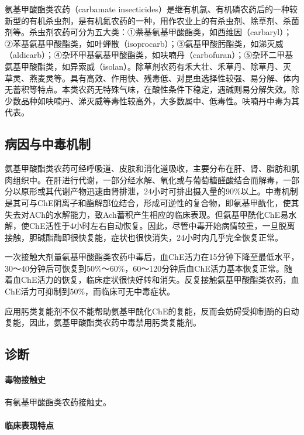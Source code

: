 氨基甲酸酯类农药（carbamate
insecticides）是继有机氯、有机磷农药后的一种较新型的有机杀虫剂，是有机氮农药的一种，用作农业上的有杀虫剂、除草剂、杀菌剂等。杀虫剂农药可分为五大类：①萘基氨基甲酸酯类，如西维因（carbaryl）；②苯基氨基甲酸酯类，如叶蝉散（isoprocarb）；③氨基甲酸肟酯类，如涕灭威（aldicarb）；④杂环甲基氨基甲酸酯类，如呋喃丹（carbofuran）；⑤杂环二甲基氨基甲酸酯类，如异索威（isolan）。除草剂农药有禾大壮、禾草丹、除草丹、灭草灵、燕麦灵等。具有高效、作用快、残毒低、对昆虫选择性较强、易分解、体内无蓄积等特点。本类农药无特殊气味，在酸性条件下稳定，遇碱则易分解失效。除少数品种如呋喃丹、涕灭威等毒性较高外，大多数属中、低毒性。呋喃丹中毒为其代表。

\subsection{病因与中毒机制}

氨基甲酸酯类农药可经呼吸道、皮肤和消化道吸收，主要分布在肝、肾、脂肪和肌肉组织中。在肝进行代谢，一部分经水解、氧化或与葡萄糖醛酸结合而解毒，一部分以原形或其代谢产物迅速由肾排泄，24小时可排出摄入量的90\%以上。中毒机制是其可与ChE阴离子和酯解部位结合，形成可逆性的复合物，即氨基甲酰化，使其失去对ACh的水解能力，致Ach蓄积产生相应的临床表现。但氨基甲酰化ChE易水解，使ChE活性于4小时左右自动恢复。因此，尽管中毒开始病情较重，一旦脱离接触，胆碱酯酶即很快复能，症状也很快消失，24小时内几乎完全恢复正常。

一次接触大剂量氨基甲酸酯类农药中毒后，血ChE活力在15分钟下降至最低水平，30～40分钟后可恢复到50\%～60\%，60～120分钟后血ChE活力基本恢复正常。随着血ChE活力的恢复，临床症状很快好转和消失。反复接触氨基甲酸酯类农药，血ChE活力可抑制到50\%，而临床可无中毒症状。

应用肟类复能剂不仅不能帮助氨基甲酰化ChE的复能，反而会妨碍受抑制酶的自动复能，因此，氨基甲酸酯类农药中毒禁用肟类复能剂。

\subsection{诊断}

\paragraph{毒物接触史}

有氨基甲酸酯类农药接触史。

\paragraph{临床表现特点}

